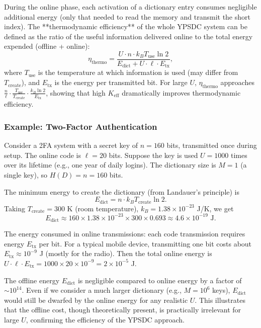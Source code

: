 \documentclass[12pt,a4paper]{article}
\theoremstyle{remark}
\newcommand{\Keff}{K_{\mathrm{eff}}}
\begin{document}
	During the online phase, each activation of a dictionary entry consumes negligible additional energy (only that needed to read the memory and transmit the short index). The **thermodynamic efficiency** of the whole YPSDC system can be defined as the ratio of the useful information delivered online to the total energy expended (offline + online):
	\begin{equation}
		\eta_{\text{thermo}} = \frac{U \cdot n \cdot k_B T_{\text{use}} \ln 2}{E_{\text{dict}} + U \cdot \ell \cdot E_{\text{tx}}}, \label{eq:thermo}
	\end{equation}
	where $T_{\text{use}}$ is the temperature at which information is used (may differ from $T_{\text{create}}$), and $E_{\text{tx}}$ is the energy per transmitted bit. For large $U$, $\eta_{\text{thermo}}$ approaches $\frac{n}{\ell} \cdot \frac{T_{\text{use}}}{T_{\text{create}}} \cdot \frac{k_B \ln 2}{E_{\text{tx}}}$, showing that high $\Keff$ dramatically improves thermodynamic efficiency.
	
	\subsubsection{Example: Two-Factor Authentication}
	Consider a 2FA system with a secret key of $n = 160$ bits, transmitted once during setup. The online code is $\ell = 20$ bits. Suppose the key is used $U = 1000$ times over its lifetime (e.g., one year of daily logins). The dictionary size is $M = 1$ (a single key), so $H(D) = n = 160$ bits.
	
	The minimum energy to create the dictionary (from Landauer's principle) is
	\[
	E_{\text{dict}} = n \cdot k_B T_{\text{create}} \ln 2.
	\]
	Taking $T_{\text{create}} = 300$ K (room temperature), $k_B = 1.38 \times 10^{-23}$ J/K, we get
	\[
	E_{\text{dict}} \approx 160 \times 1.38 \times 10^{-23} \times 300 \times 0.693 \approx 4.6 \times 10^{-19} \text{ J}.
	\]
	
	The energy consumed in online transmissions: each code transmission requires energy $E_{\text{tx}}$ per bit. For a typical mobile device, transmitting one bit costs about $E_{\text{tx}} \approx 10^{-9}$ J (mostly for the radio). Then the total online energy is $U \cdot \ell \cdot E_{\text{tx}} = 1000 \times 20 \times 10^{-9} = 2 \times 10^{-5}$ J.
	
	The offline energy $E_{\text{dict}}$ is negligible compared to online energy by a factor of $\sim 10^{14}$. Even if we consider a much larger dictionary (e.g., $M = 10^6$ keys), $E_{\text{dict}}$ would still be dwarfed by the online energy for any realistic $U$. This illustrates that the offline cost, though theoretically present, is practically irrelevant for large $U$, confirming the efficiency of the YPSDC approach.
	
\end{document}
